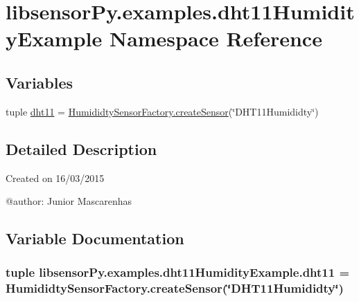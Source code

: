 \hypertarget{namespacelibsensorPy_1_1examples_1_1dht11HumidityExample}{}\section{libsensor\+Py.\+examples.\+dht11\+Humidity\+Example Namespace Reference}
\label{namespacelibsensorPy_1_1examples_1_1dht11HumidityExample}
\subsection*{Variables}
\begin{DoxyCompactItemize}
\item 
tuple \hyperlink{namespacelibsensorPy_1_1examples_1_1dht11HumidityExample_a3eef28dedc75a5fc42af71d43991b740}{dht11} = \hyperlink{classconcretefactory_1_1humiditySensorFactory_1_1HumididtySensorFactory_a591e773357247fd00a760fa160d7b231}{Humididty\+Sensor\+Factory.\+create\+Sensor}(\char`\"{}D\+H\+T11\+Humididty\char`\"{})
\end{DoxyCompactItemize}


\subsection{Detailed Description}
\begin{DoxyVerb}Created on 16/03/2015

@author: Junior Mascarenhas
\end{DoxyVerb}
 

\subsection{Variable Documentation}
\hypertarget{namespacelibsensorPy_1_1examples_1_1dht11HumidityExample_a3eef28dedc75a5fc42af71d43991b740}{}
\subsubsection[{dht11}]{\setlength{\rightskip}{0pt plus 5cm}tuple libsensor\+Py.\+examples.\+dht11\+Humidity\+Example.\+dht11 = {\bf Humididty\+Sensor\+Factory.\+create\+Sensor}(\char`\"{}D\+H\+T11\+Humididty\char`\"{})}\label{namespacelibsensorPy_1_1examples_1_1dht11HumidityExample_a3eef28dedc75a5fc42af71d43991b740}
